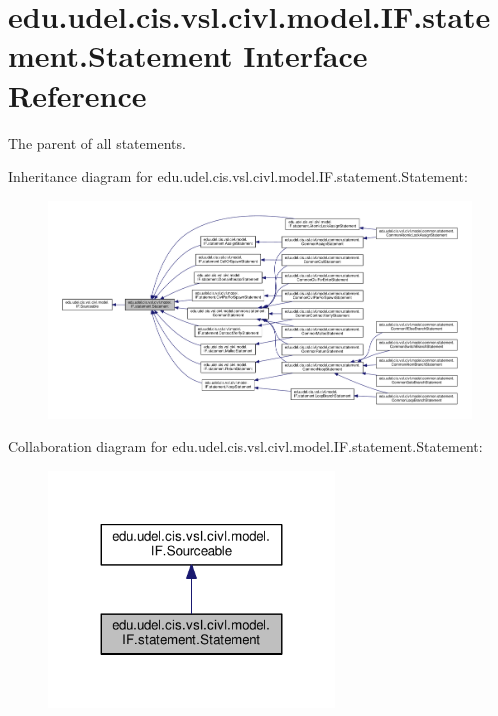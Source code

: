 \hypertarget{interfaceedu_1_1udel_1_1cis_1_1vsl_1_1civl_1_1model_1_1IF_1_1statement_1_1Statement}{}\section{edu.\+udel.\+cis.\+vsl.\+civl.\+model.\+I\+F.\+statement.\+Statement Interface Reference}
\label{interfaceedu_1_1udel_1_1cis_1_1vsl_1_1civl_1_1model_1_1IF_1_1statement_1_1Statement}


The parent of all statements.  




Inheritance diagram for edu.\+udel.\+cis.\+vsl.\+civl.\+model.\+I\+F.\+statement.\+Statement\+:
\nopagebreak
\begin{figure}[H]
\begin{center}
\leavevmode
\includegraphics[width=350pt]{interfaceedu_1_1udel_1_1cis_1_1vsl_1_1civl_1_1model_1_1IF_1_1statement_1_1Statement__inherit__graph}
\end{center}
\end{figure}


Collaboration diagram for edu.\+udel.\+cis.\+vsl.\+civl.\+model.\+I\+F.\+statement.\+Statement\+:
\nopagebreak
\begin{figure}[H]
\begin{center}
\leavevmode
\includegraphics[width=215pt]{interfaceedu_1_1udel_1_1cis_1_1vsl_1_1civl_1_1model_1_1IF_1_1statement_1_1Statement__coll__graph}
\end{center}
\end{figure}
